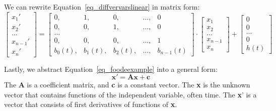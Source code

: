We can rewrite Equation~\ref{eq_diffvervarslinear} in matrix form:
\begin{equation} \label{eq_foodeexample}
	\begin{bmatrix}
		x_{1}' \\
    x_{2}' \\
    \dots  \\
    x_{n-1}' \\
    x_{n}'
	\end{bmatrix}
    = 
  \begin{bmatrix}
		0, & 1, & 0, & \dots, & 0 \\
    0, & 0, & 1, & \dots, & 0 \\
    \dots \\
    0, & 0, & 0, & \dots, & 1 \\
    b_{0}(t), & b_{1}(t), & b_{2}(t), & \dots, & b_{n-1}(t)
	\end{bmatrix}
    \cdot
  \begin{bmatrix}
		x_{1} \\
    x_{2} \\
    \dots  \\
    x_{n-1} \\
    x_{n}
	\end{bmatrix}
    + 
  \begin{bmatrix}
    0 \\
    0 \\
    \dots  \\
    0 \\
    h(t)
	\end{bmatrix}
\end{equation}

Lastly, we abstract Equation~\ref{eq_foodeexample} into a general form: 
\begin{equation} \label{eq_foode}
    \boldsymbol{x}' = \boldsymbol{Ax} + \boldsymbol{c}
\end{equation}
The \textbf{A} is a coefficient matrix, and \textbf{c} is a constant vector. The \textbf{x} is the unknown vector that contains functions of the independent variable, often time. The \textbf{x}' is a vector that consists of first derivatives of functions of \textbf{x}.


